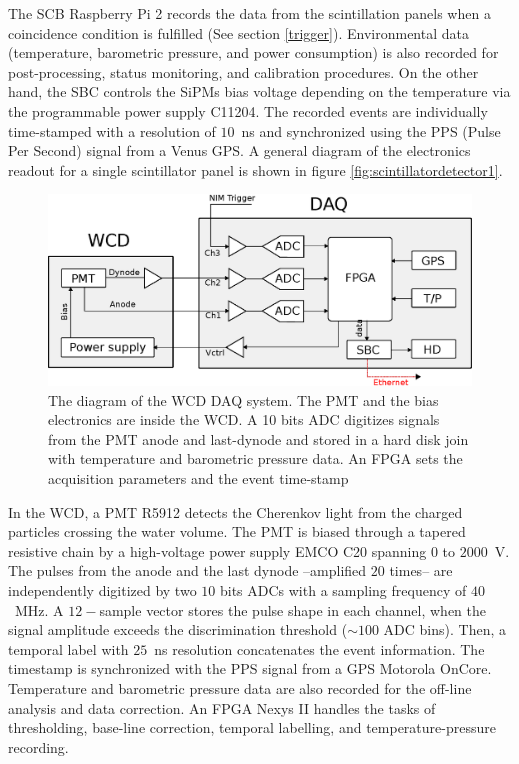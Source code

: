 \documentclass[letterpaper,11pt]{article}
\begin{document}
The SCB Raspberry Pi 2 records the data from the scintillation panels when a coincidence condition is fulfilled (See section \ref{trigger}). Environmental data (temperature, barometric pressure, and power consumption) is also recorded for post-processing, status monitoring, and calibration procedures. On the other hand, the SBC controls the SiPMs bias voltage depending on the temperature via the programmable power supply C11204. The recorded events are individually time-stamped with a resolution of $10$~ns and synchronized using the PPS (Pulse Per Second) signal from a Venus GPS. A general diagram of the electronics readout for a single scintillator panel is shown in figure \ref{fig:scintillatordetector1}.

\begin{figure}[htb]
\centering
\includegraphics[width=0.9\columnwidth]{Figures/WCDDAQ.eps}
\caption{The diagram of the WCD DAQ system. The PMT and the bias electronics are inside the WCD. A 10 bits ADC digitizes signals from the PMT anode and last-dynode and stored in a hard disk join with temperature and barometric pressure data. An FPGA sets the acquisition parameters and the event time-stamp}
  \label{fig:WCD}
\end{figure}

In the WCD, a PMT R5912 detects the Cherenkov light from the charged particles crossing the water volume. The PMT is biased through a tapered resistive chain by a high-voltage power supply EMCO C20 spanning $0$ to $2000$~V. The pulses from the anode and the last dynode --amplified $20$ times-- are independently digitized by two $10$ bits ADCs with a sampling frequency of $40$~MHz. A $12-$sample vector stores the pulse shape in each channel,  when the signal amplitude exceeds the discrimination threshold ($\sim 100$ ADC bins).  Then, a temporal label with $25$~ns resolution concatenates the event information. The timestamp is synchronized with the PPS signal from a GPS Motorola OnCore. Temperature and barometric pressure data are also recorded for the off-line analysis and data correction. An FPGA Nexys II handles the tasks of thresholding, base-line correction, temporal labelling, and temperature-pressure recording.
\end{document}
